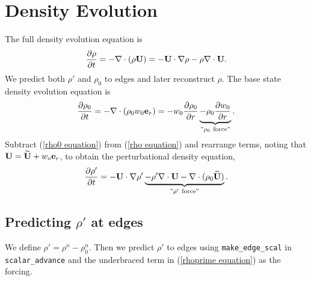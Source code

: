 
\section{Density Evolution}
The full density evolution equation is
\begin{equation}
\frac{\partial\rho}{\partial t} = -\nabla\cdot(\rho{\bf U}) = -{\bf U}\cdot\nabla\rho 
- \rho\nabla\cdot{\bf U}. \label{rho equation}
\end{equation}
We predict both $\rho'$ and $\rho_0$ to edges and later reconstruct $\rho$.
The base state density evolution equation is
\begin{equation}
\frac{\partial\rho_0}{\partial t} = -\nabla\cdot(\rho_0 w_0 {\bf e}_r) = 
-w_0\frac{\partial\rho_0}{\partial r} 
\underbrace{-\rho_0\frac{\partial w_0}{\partial r}}_{"\rho_0 ~ \text{force}"}.
\label{rho0 equation}
\end{equation}
Subtract (\ref{rho0 equation}) from (\ref{rho equation}) and rearrange
terms, noting that ${\bf U} = \widetilde{{\bf U}} + w_o{\bf e}_r$, to obtain the
perturbational density equation,
\begin{equation}
\frac{\partial\rho'}{\partial t} = -{\bf U}\cdot\nabla\rho' \underbrace{- \rho'\nabla\cdot{\bf U} 
- \nabla\cdot(\rho_0\widetilde{{\bf U}})}_{"\rho' ~ \text{force}"}. 
\label{rhoprime equation}
\end{equation}

\subsection{Predicting $\rho'$ at edges}
We define $\rho' = \rho^n - \rho_0^n$.  Then we predict $\rho'$ to
edges using {\tt make\_edge\_scal} in {\tt scalar\_advance} and the
underbraced term in (\ref{rhoprime equation}) as the forcing.

